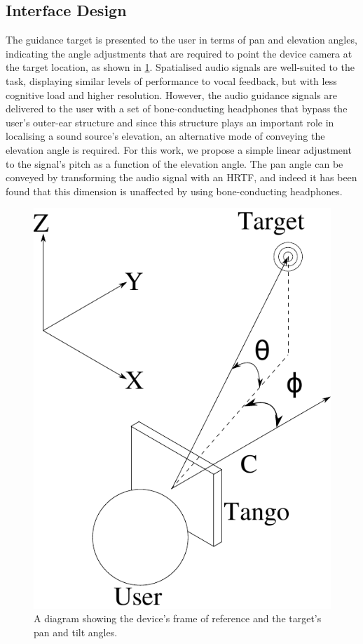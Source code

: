 \documentclass{llncs}
\begin{document}
\subsection{Interface Design}

The guidance target is presented to the user in terms of pan and elevation angles, indicating the angle adjustments that are required to point the device camera at the target location, as shown in \cref{fig:cam-coords}.
Spatialised audio signals are well-suited to the task, displaying similar levels of performance to vocal feedback, but with less cognitive load and higher resolution\cite{klatzky2006cognitive}.
However, the audio guidance signals are delivered to the user with a set of bone-conducting headphones that bypass the user's outer-ear structure and since this structure plays an important role in localising a sound source's elevation\cite{blauert1969sound}, an alternative mode of conveying the elevation angle is required.
For this work, we propose a simple linear adjustment to the signal's pitch as a function of the elevation angle. 
The pan angle can be conveyed by transforming the audio signal with an HRTF, and indeed it has been found that this dimension is unaffected by using bone-conducting headphones\cite{schonstein2008comparison,macdonald2006spatial,stanley2006lateralization}. 

\begin{figure}
  \centering
  \includegraphics[width=0.3\columnwidth]{figures/camera_coordinate.pdf}
  \caption{A diagram showing the device's frame of reference and the target's pan and tilt angles.}\label{fig:cam-coords}
\end{figure}


\end{document}
